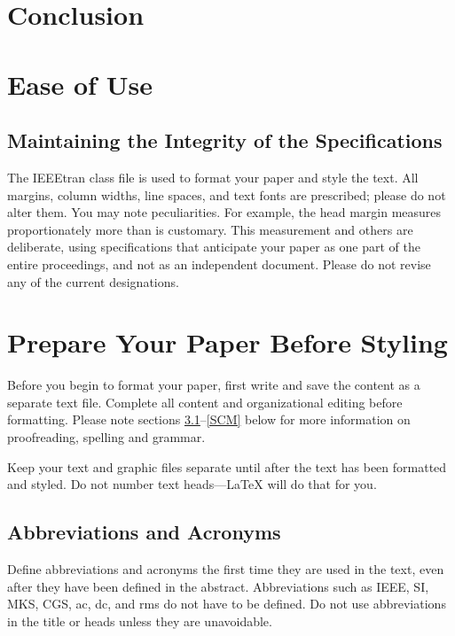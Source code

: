 \documentclass[conference]{IEEEtran}
\begin{document}
\section{Conclusion}
\label{section:conclusion}

\color{red}
\section{Ease of Use}

\subsection{Maintaining the Integrity of the Specifications}

The IEEEtran class file is used to format your paper and style the text. All margins, 
column widths, line spaces, and text fonts are prescribed; please do not 
alter them. You may note peculiarities. For example, the head margin
measures proportionately more than is customary. This measurement 
and others are deliberate, using specifications that anticipate your paper 
as one part of the entire proceedings, and not as an independent document. 
Please do not revise any of the current designations.

\section{Prepare Your Paper Before Styling}

Before you begin to format your paper, first write and save the content as a 
separate text file. Complete all content and organizational editing before 
formatting. Please note sections \ref{AA}--\ref{SCM} below for more information on 
proofreading, spelling and grammar.

Keep your text and graphic files separate until after the text has been 
formatted and styled. Do not number text heads---{\LaTeX} will do that 
for you.

\subsection{Abbreviations and Acronyms}\label{AA}

Define abbreviations and acronyms the first time they are used in the text, 
even after they have been defined in the abstract. Abbreviations such as 
IEEE, SI, MKS, CGS, ac, dc, and rms do not have to be defined. Do not use 
abbreviations in the title or heads unless they are unavoidable.
\end{document}
